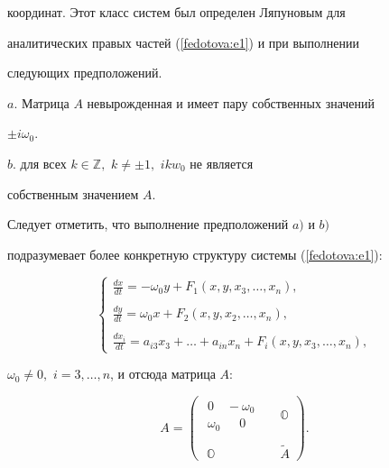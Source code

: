 координат. Этот класс систем был определен Ляпуновым для

аналитических правых частей (\ref{fedotova:e1}) и при выполнении

следующих предположений.





$a.$ Матрица $A$ невырожденная и имеет пару собственных значений

$\pm i\omega_0.$



$b.$ для всех $k\in\mathbb{Z},$ $k\neq\pm1,$ $ikw_0$ не является

собственным значением $A.$



Следует отметить, что выполнение предположений $a)$ и $b)$

подразумевает более конкретную структуру системы (\ref{fedotova:e1}):

\begin{equation}

\label{fedotova:e2} \left\{\begin{array}{lll}

\displaystyle\frac{dx}{dt}=-\omega_0y+F_1(x, y, x_3, \ldots, x_n),\\ \\

\displaystyle\frac{dy}{dt}=\omega_0x+F_2(x, y, x_2, \ldots, x_n),\\ \\

\displaystyle\frac{dx_i}{dt}=a_{i3}x_3+\ldots+a_{in}x_n+F_i(x, y, x_3, \ldots, x_n),

\end{array}

\right.

\end{equation}

$\omega_0\neq0,$ $i=3, \ldots, n$, и отсюда матрица $A$:

\begin{equation}

\label{fedotova:e3}

A=\left(\begin{array}{lll}\begin{array}{ll} 0\,\,\,\,\,\,-\omega_0\\

\omega_0\,\,\,\,\,\,\,\,\,0\end{array}&&\mathbb{O}\\ \\

\,\,\mathbb{O}&&\tilde{A}

\end{array}\right).

\end{equation}





